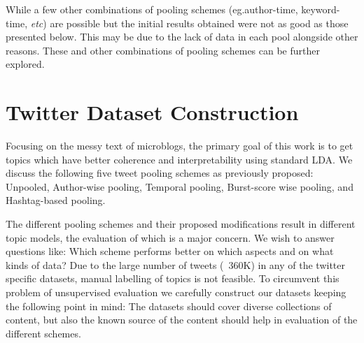 \documentclass[10pt,a5paper,twoside]{article}
\begin{document}
While a few other combinations of pooling schemes (eg.author-time,
keyword-time, \textit{etc}) are possible but the initial results
obtained were not as good as those presented below. This may be due to
the lack of data in each pool alongside other reasons. These and other
combinations of pooling schemes can be further explored.


\section{Twitter Dataset Construction}

\label{sec:dataset}

Focusing on the messy text of microblogs, the primary goal of this
work is to get topics which have better coherence and interpretability
using standard LDA. We discuss the following five tweet pooling
schemes as previously proposed: Unpooled, Author-wise
pooling, Temporal pooling, Burst-score wise pooling, and Hashtag-based
pooling.

The different pooling schemes and their proposed modifications result
in different topic models, the evaluation of which is a major
concern. We wish to answer questions like: Which scheme performs
better on which aspects and on what kinds of data? Due to the large
number of tweets (~360K) in any of the twitter specific datasets,
manual labelling of topics is not feasible.  To circumvent this
problem of unsupervised evaluation we carefully construct our datasets
keeping the following point in mind: The datasets should cover diverse
collections of content, but also the known source of the content
should help in evaluation of the different schemes.
\end{document}

